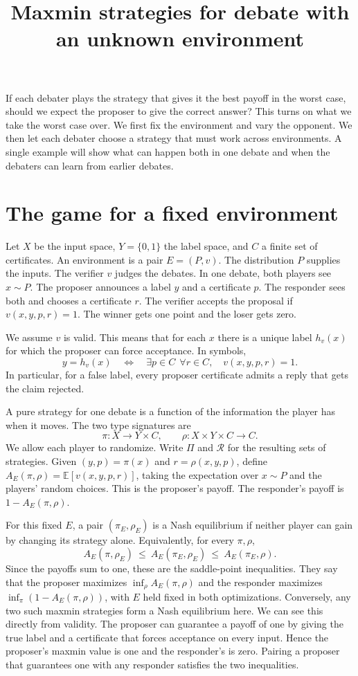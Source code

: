 \documentclass[11pt]{article}
\title{Maxmin strategies for debate with an unknown environment}
\author{}
\date{}
\newcommand{\E}{\mathbb E}
\begin{document}
\maketitle

If each debater plays the strategy that gives it the best payoff in the
worst case, should we expect the proposer to give the correct answer?
This turns on what we take the worst case over. We first fix the environment
and vary the opponent. We then let each debater choose a strategy that must
work across environments. A single example will show what can happen both
in one debate and when the debaters can learn from earlier debates.

\section{The game for a fixed environment}

Let \(X\) be the input space, \(Y=\{0,1\}\) the label space, and \(C\) a
finite set of certificates. An environment is a pair \(E=(P,v)\). The
distribution \(P\) supplies the inputs. The verifier \(v\) judges the
debates. In one debate, both players see \(x\sim P\). The proposer announces
a label \(y\) and a certificate \(p\). The responder sees both and chooses a
certificate \(r\). The verifier accepts the proposal if \(v(x,y,p,r)=1\).
The winner gets one point and the loser gets zero.

We assume \(v\) is valid. This means that for each \(x\) there is a unique
label \(h_v(x)\) for which the proposer can force acceptance. In symbols,
\[
    y=h_v(x)
    \quad\Longleftrightarrow\quad
    \exists p\in C\ \ \forall r\in C,\quad v(x,y,p,r)=1.
\]
In particular, for a false label, every proposer certificate admits a reply
that gets the claim rejected.

A pure strategy for one debate is a function of the information the player
has when it moves. The two type signatures are
\[
    \pi:X\longrightarrow Y\times C,\qquad
    \rho:X\times Y\times C\longrightarrow C.
\]
We allow each player to randomize. Write \(\Pi\) and \(\mathcal R\) for the
resulting sets of strategies. Given \((y,p)=\pi(x)\) and
\(r=\rho(x,y,p)\), define \(A_E(\pi,\rho)=\E[v(x,y,p,r)]\), taking the
expectation over \(x\sim P\) and the players' random choices. This is the
proposer's payoff. The responder's payoff is \(1-A_E(\pi,\rho)\).

For this fixed \(E\), a pair \((\pi_E,\rho_E)\) is a Nash equilibrium if
neither player can gain by changing its strategy alone. Equivalently, for
every \(\pi,\rho\),
\[
    A_E(\pi,\rho_E)\ \le\ A_E(\pi_E,\rho_E)\ \le\ A_E(\pi_E,\rho).
\]
Since the payoffs sum to one, these are the saddle-point inequalities.
They say that the proposer maximizes \(\inf_\rho A_E(\pi,\rho)\) and the
responder maximizes \(\inf_\pi(1-A_E(\pi,\rho))\), with \(E\) held fixed
in both optimizations. Conversely, any two such maxmin strategies form a
Nash equilibrium here. We can see this directly from validity. The proposer
can guarantee a payoff of one by giving the true label and a certificate
that forces acceptance on every input. Hence the proposer's maxmin value is
one and the responder's is zero. Pairing a proposer that guarantees one
with any responder satisfies the two inequalities.
\end{document}

